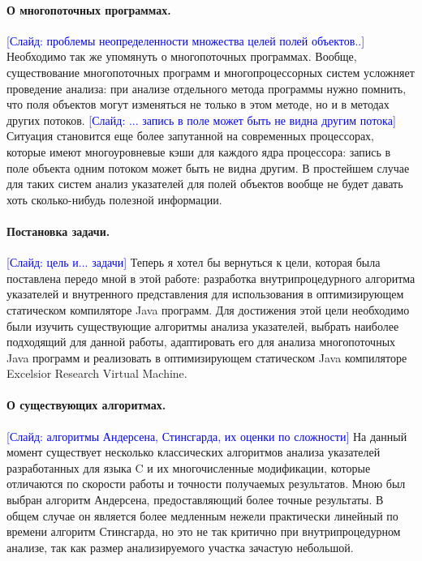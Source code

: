 \documentclass[12pt]{article}
\newcommand{\slide}[1]{\textcolor{Blue}{[Слайд: #1]}}
\newcommand{\eng}[1]{{\English#1}}
\begin{document}
  \paragraph{О многопоточных программах.}
  \slide{проблемы неопределенности множества целей полей объектов..}
  Необходимо так же упомянуть о многопоточных программах. Вообще,
  существование многопоточных программ и многопроцессорных систем усложняет
  проведение анализа: при анализе отдельного метода программы нужно помнить,
  что поля объектов могут изменяться не только в этом методе, но и в методах
  других потоков.
  \slide{... запись в поле может быть не видна другим потока}
  Ситуация становится еще более запутанной на современных процессорах, которые
  имеют многоуровневые кэши для каждого ядра процессора: запись в поле объекта
  одним потоком может быть не видна другим.
  В простейшем случае для таких систем анализ указателей для полей объектов
  вообще не будет давать хоть сколько-нибудь полезной информации.

  \paragraph{Постановка задачи.}
  \slide{цель и... задачи}
  Теперь я хотел бы вернуться к цели, которая была поставлена передо мной в
  этой работе: разработка внутрипроцедурного алгоритма указателей и внутренного
  представления для использования в оптимизирующем статическом компиляторе Java
  программ. Для достижения этой цели необходимо были изучить существующие
  алгоритмы анализа указателей, выбрать наиболее подходящий для данной работы,
  адаптировать его для анализа многопоточных Java программ и реализовать в
  оптимизирующем статическом Java компиляторе \eng{Excelsior Research Virtual
  Machine}.

  \paragraph{О существующих алгоритмах.}
  \slide{алгоритмы Андерсена, Стинс\-гар\-да, их оценки по сложности}
  На данный момент существует несколько классических алгоритмов анализа
  указателей разработанных для языка C и их многочисленные модификации, которые
  отличаются по скорости работы и точности получаемых результатов. Мною был
  выбран алгоритм Андерсена, предоставляющий более точные результаты. В общем
  случае он является более медленным нежели практически линейный по времени
  алгоритм Стинсгарда, но это не так критично при внутрипроцедурном анализе,
  так как размер анализируемого участка зачастую небольшой.
\end{document}
